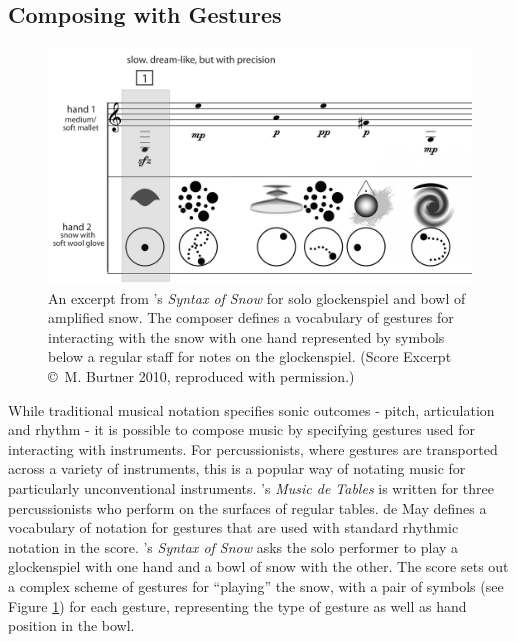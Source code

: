 \documentclass[graybox]{svmult}
\begin{document}
\subsection{Composing with Gestures}
\label{subsec:composing-gestures}

\begin{figure}
\begin{center}
\includegraphics[width=0.7\columnwidth]{figures/syntaxofsnow-excerpt-bw}
\end{center}
\caption{An excerpt from \citeauthor{Burtner:2011fk}'s
  \citeyearpar{Burtner:2011fk} \emph{Syntax of Snow} for solo
  glockenspiel and bowl of amplified snow. The composer defines a
  vocabulary of gestures for interacting with the snow with one hand
  represented by symbols below a regular staff for notes on the
  glockenspiel. (Score Excerpt \copyright~M. Burtner 2010, reproduced
  with permission.)}
\label{fig:SyntaxOfSnow}
\end{figure}

While traditional musical notation specifies sonic outcomes - pitch,
articulation and rhythm - it is possible to compose music by
specifying gestures used for interacting with instruments. For
percussionists, where gestures are transported across a variety of
instruments, this is a popular way of notating music for particularly
unconventional instruments. \citeauthor{May:1987fk}'s \citeyearpar{May:1987fk} \emph{Music
de Tables} is written for three percussionists who
perform on the surfaces of regular tables. de May defines a vocabulary
of notation for gestures that are used with standard rhythmic notation
in the score. \citeauthor{Burtner:2011fk}'s \citeyearpar{Burtner:2011fk} \emph{Syntax of Snow}
asks the solo performer to play a glockenspiel with one hand and a
bowl of snow with the other. The score sets out a complex scheme of
gestures for ``playing'' the snow, with a pair of symbols (see Figure
\ref{fig:SyntaxOfSnow}) for each gesture, representing the type of
gesture as well as hand position in the bowl. 
\end{document}
